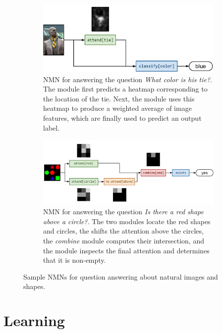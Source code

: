 \documentclass[10pt,twocolumn,letterpaper]{article}
\begin{document}
\begin{figure}
  \begin{subfigure}[t]{0.4\textwidth}
    \includegraphics[width=\textwidth]{fig/full1}
    \caption{NMN for answering the question \emph{What color is
    his tie?}. The  module first predicts a heatmap
    corresponding to the location of the tie. Next, the 
    module uses this heatmap to produce a weighted average of image features,
  which are finally used to predict an output label.}
  \end{subfigure}
  \hfill
  \begin{subfigure}[t]{0.55\textwidth}
    \includegraphics[width=\textwidth]{fig/full2}
    \caption{NMN for answering the question \emph{Is there a red shape above a
    circle?}. The two  modules locate the red shapes and circles,
    the  shifts the attention above the circles, the
    \emph{combine} module computes their intersection, and the
     module inspects the final attention and determines that it is
    non-empty.}
  \end{subfigure}
  \caption{Sample NMNs for question answering about natural images and shapes.}
\end{figure}

\section{Learning}
\end{document}
